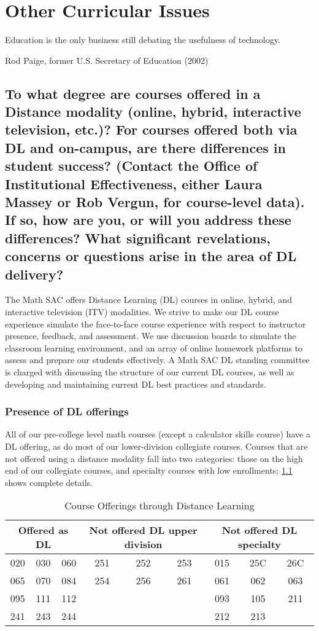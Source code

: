 \chapter{Other  Curricular Issues}\label{chap:otherissues}
\epigraph{Education is the only business still debating the usefulness of technology.}{Rod Paige, former U.S. Secretary of Education (2002)}
\section[Distance education]{To what degree are courses offered in a Distance
modality (online, hybrid, interactive television, etc.)? For courses offered
both via DL and on-campus, are there differences in student success? (Contact
the Office of Institutional Effectiveness, either Laura Massey or Rob Vergun,
for course-level data). If so, how are you, or will you address these
differences? What significant revelations, concerns or questions arise in the
area of DL delivery?}\label{other:sec:distancelearning}


The Math SAC offers Distance Learning (DL) courses in online, hybrid, and
interactive television (ITV) modalities.  We strive to make our DL course
experience simulate the face-to-face course experience with respect to
instructor presence, feedback, and assessment. We use discussion boards to
simulate the classroom learning environment, and an array of online homework
platforms to assess and prepare our students effectively. A Math SAC DL standing
committee is charged with discussing the structure of our current DL courses, as
well as developing and maintaining current DL best practices and standards.

\subsection{Presence of DL offerings}

All of our pre-college level math courses (except a calculator skills course)
have a DL offering, as do most of our lower-division collegiate courses.
Courses that are not offered using a distance modality fall into two categories:
those on the high end of our collegiate courses, and specialty courses with low
enrollments; \cref{tab:sec3:DLofferings} shows complete details.

\begin{table}
\caption{Course Offerings through Distance Learning}\label{tab:sec3:DLofferings}
\centering
\begin{tabular}{ccccccccc}
\toprule
\multicolumn{3}{p{1in}}{Offered as DL} & \multicolumn{3}{p{1in}}{Not offered  DL upper division} & \multicolumn{3}{p{1in}}{Not offered  DL specialty}\\
\midrule
020& 030& 060& 		251& 252& 253&		015& 25C& 26C\\
065& 070& 084& 		254& 256& 261&		061& 062& 063\\
095& 111& 112& 		&&&					093& 105& 211\\
241& 243& 244&		&&&					212& 213\\
\bottomrule
\end{tabular}
\end{table}

